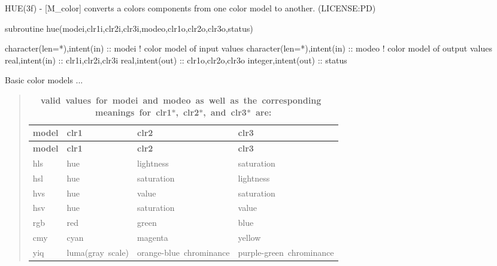 \begin{DoxyDescription}
\item[\label{_HUE}%
N\+A\+ME ]H\+U\+E(3f) -\/ \mbox{[}M\+\_\+color\mbox{]} converts a color\textquotesingle{}s components from one color model to another. (L\+I\+C\+E\+N\+SE\+:PD) 


\item[S\+Y\+N\+O\+P\+S\+IS ]
\begin{DoxyPre}\end{DoxyPre}



\begin{DoxyPre}    subroutine hue(modei,clr1i,clr2i,clr3i,modeo,clr1o,clr2o,clr3o,status)\end{DoxyPre}



\begin{DoxyPre}     character(len=*),intent(in) :: modei  ! color model of input values
     character(len=*),intent(in) :: modeo  ! color model of output values
     real,intent(in)             :: clr1i,clr2i,clr3i
     real,intent(out)            :: clr1o,clr2o,clr3o
     integer,intent(out)         :: status
    \end{DoxyPre}
 


\item[D\+E\+S\+C\+R\+I\+P\+T\+I\+ON ]Basic color models ... ~\newline
~\newline


\begin{quote}

\tabulinesep=1mm
\begin{longtabu} spread 0pt [c]{*{4}{|X[-1]}|}
\caption{{\bfseries   valid~values~for~modei~and~modeo~as~well~as~the~corresponding~ meanings~for~clr1$\ast$,~clr2$\ast$,~and~clr3$\ast$~are\+:  }}\label{_}\\
\hline
\rowcolor{\tableheadbgcolor}\textbf{ model  }&\textbf{ clr1  }&\textbf{ clr2  }&\textbf{ clr3   }\\
\endfirsthead
\hline
\endfoot
\hline
\rowcolor{\tableheadbgcolor}\textbf{ model  }&\textbf{ clr1  }&\textbf{ clr2  }&\textbf{ clr3   }\\
\endhead
hls  &hue  &lightness  &saturation   \\
hsl  &hue  &saturation  &lightness   \\
hvs  &hue  &value  &saturation   \\
hsv  &hue  &saturation  &value   \\
rgb  &red  &green  &blue   \\
cmy  &cyan  &magenta  &yellow   \\
yiq  &luma(gray~scale)  &orange-\/blue~chrominance  &purple-\/green~chrominance   \\
\end{longtabu}
\end{quote}




\end{DoxyDescription}

